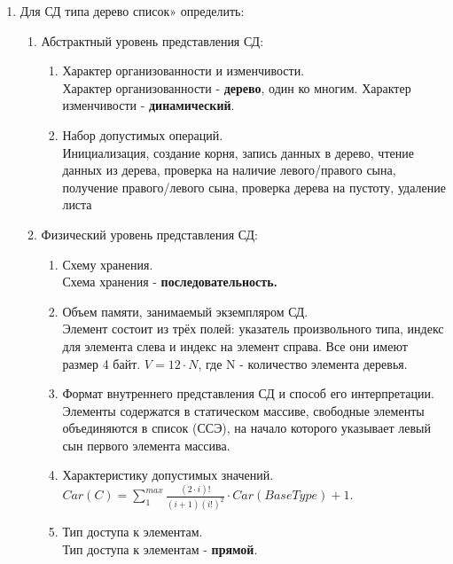 \documentclass[a4paper,14pt]{extarticle}
\begin{document}
\begin{enumerate}
	\item Для СД типа дерево список» определить:
	      \begin{enumerate}[label*=\arabic*.]
		      \item Абстрактный уровень представления СД:

		            \begin{enumerate}[label*=\arabic*.]
			            \item Характер организованности и изменчивости.\\
			            Характер организованности - \textbf{дерево}, один ко многим. Характер изменчивости - \textbf{динамический}.
			            \item Набор допустимых операций.\\
			            Инициализация, создание корня, запись данных в дерево, 
                        чтение данных из дерева, проверка на наличие левого/правого сына,
                        получение правого/левого сына, проверка дерева на пустоту, 
                        удаление листа
		            \end{enumerate}

		      \item Физический уровень представления СД:

		            \begin{enumerate}[label*=\arabic*.]
			            \item Схему хранения.\\
			            Схема хранения - \textbf{последовательность.}
			            \item Объем памяти, занимаемый экземпляром СД.\\
			            Элемент состоит из трёх полей: указатель произвольного типа, 
                        индекс для элемента слева и индекс на элемент справа. Все они имеют размер 4 байт. 
                        $V = 12 \cdot N$, где N - количество элемента деревья.
			            \item Формат внутреннего представления СД и способ его интерпретации.\\
			            Элементы содержатся в статическом массиве, свободные элементы объединяются
                        в список (ССЭ), на начало которого указывает левый сын первого элемента массива.
			            \item Характеристику допустимых значений.\\
			            $Car(C) = \sum_{1}^{max} \frac{(2 \cdot i)!}{(i + 1)(i!)^2} \cdot Car(BaseType) + 1$.
			            \item Тип доступа к элементам.\\
						Тип доступа к элементам - \textbf{прямой}.
		            \end{enumerate}


\end{enumerate}
\end{enumerate}
\end{document}
